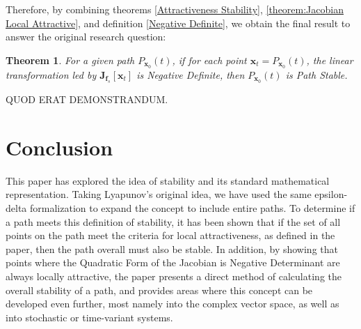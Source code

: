 \documentclass{article}
\newcommand{\B}[1]{\boldsymbol{#1}}
\newtheorem{theorem}{Theorem}[section]
\theoremstyle{definition}
\theoremstyle{remark}
\begin{document}
Therefore, by combining theorems \ref{Attractiveness Stability}, \ref{theorem:Jacobian Local Attractive}, and definition \ref{Negative Definite},
we obtain the final result to answer the original research question:

\begin{theorem} 
  \label{Negative Definite Path Stability}
  For a given path $P_{\B{x}_0}(t)$, if for each point $\B{x}_t = P_{\B{x}_0}(t)$,
  the linear transformation led by $\B{J}_{\B{f}_s}[\B{x}_t]$
  is Negative Definite, then $P_{\B{x}_0}(t)$ is Path Stable.
\end{theorem}
QUOD ERAT DEMONSTRANDUM.

\section{Conclusion}
This paper has explored the idea of stability and its standard mathematical 
representation. Taking Lyapunov's original idea, we have used the same
epsilon-delta formalization to expand the concept to include entire paths.
To determine if a path meets this definition of stability, it has been
shown that if the set of all points on the path meet the criteria for 
local attractiveness, as defined in the paper, then the path overall must 
also be stable. In addition, by showing that points where the Quadratic Form
of the Jacobian is Negative Determinant are always locally attractive, the paper
presents a direct method of calculating the overall stability of a path, and 
provides areas where this concept can be developed even further, most namely into
the complex vector space, as well as into stochastic or time-variant systems. 


\pagebreak
\medskip



\end{document}
